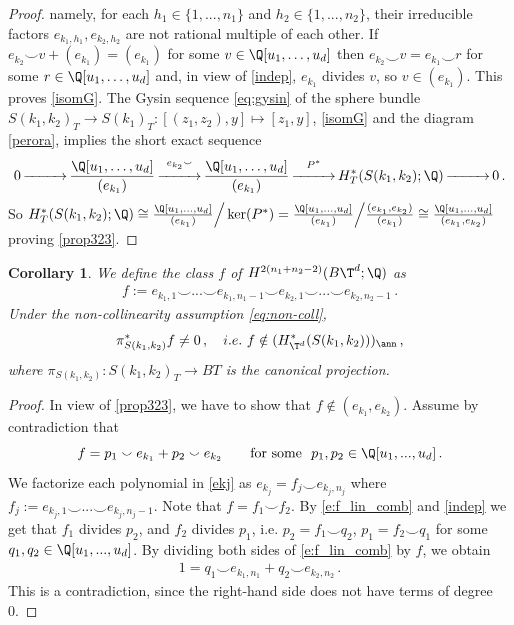 \documentclass[11pt,a4paper,reqno]{article}
\DeclareMathOperator*{\tttoup}{\xrightarrow{\hspace*{25pt}}}
\numberwithin{equation}{section}
\newtheorem{corollary}[theorem]{Corollary}
\theoremstyle{definition}
\begin{document}
\begin{proof}
namely, for each $h_1\in\{1,...,n_1\}$ and $h_2\in\{1,...,n_2\}$, their irreducible factors $e_{k_1,h_1},e_{k_2,h_2}$ are not 
rational multiple of each other.
If $ e_{k_2} \smallsmile v+ (e_{k_1})= (e_{k_1})$
for some $ v \in 
\Q[u_1,\dots, u_d] $ then 
$ e_{k_2} \smallsmile v 
= e_{k_1} \smallsmile r $
for some $ r \in 
\Q[u_1,\dots, u_d] $
and, in view of \eqref{indep},
$ e_{k_1} $ divides $ v $,
so $ v \in (e_{k_1})$.
This proves  \eqref{isomG}. 
The Gysin sequence 
\eqref{eq:gysin} of the sphere bundle $S(k_1,k_2)_T \to S(k_1)_T: [(z_1,z_2),y]\mapsto [z_1,y]$, \eqref{isomG}
and  the diagram \eqref{perora}, 
implies the short exact sequence
\begin{align*}
    0\tttoup \frac{\Q[u_1,\dots, u_d]}{(e_{k_1})} \tttoup^{e_{k_2}\smallsmile} \frac{\Q[u_1,\dots, u_d]}{(e_{k_1})} \tttoup^{P^*} H^*_T(S(k_1,k_2);\Q) \tttoup 0 \, . 
\end{align*}
So $ H^*_T(S(k_1,k_2);\Q)\cong \frac{\Q[u_1,\dots, u_d]}{(e_{k_1})}\Big/\ker(P^*)=\frac{\Q[u_1,\dots, u_d]}{(e_{k_1})}\Big/\frac{(e_{k_1},e_{k_2})}{(e_{k_1})}\cong \frac{\Q[u_1,\dots, u_d]}{(e_{k_1},e_{k_2})}$ proving \eqref{prop323}.
\end{proof}


\begin{corollary}\label{cor:nonzero cohomology class}
We define the class $ f $ of $H^{2(n_1+n_2-2)}(B\T^d;\Q) $ as 
\begin{align}\label{eq:f cup product ei}
 f
 :=
 e_{k_1,1}\smallsmile...\smallsmile e_{k_1,n_1-1} \smallsmile
 e_{k_2,1}\smallsmile...\smallsmile e_{k_2,n_2-1}  \, .
\end{align}
Under the non-collinearity assumption \eqref{eq:non-coll},
\[
\pi_{S(k_1,k_2)}^*f\neq0 \, , 
\quad  i.e. \ f \notin (H^*_{\T^d}(S(k_1,k_2)))_\ann  \, , 
\]
where  
$\pi_{S(k_1,k_2)}:S(k_1,k_2)_T\to BT$ is the canonical projection.
\end{corollary}

\begin{proof}
In view of \eqref{prop323}, 
we have to show that $f\not\in(e_{k_1},e_{k_2})$.
Assume by contradiction  that
\begin{equation}
\label{e:f_lin_comb}
f=p_1\smallsmile e_{k_1}+p_2\smallsmile e_{k_2} 
\qquad \text{for some} \ \   p_1,p_2\in\Q[u_1,...,u_d] \, .
\end{equation}
We factorize each polynomial 
in \eqref{ekj}
as 
$e_{k_j}=f_j\smallsmile e_{k_j,n_j}$
where 
$ f_j:=e_{k_j,1}\smallsmile...\smallsmile e_{k_j,n_j-1} $.  
Note that  $f=f_1\smallsmile f_2$.  
By \eqref{e:f_lin_comb} 
and \eqref{indep} we get that $f_1$ divides $p_2$, and $f_2$ divides $p_1$, i.e.
$ p_2=f_1\smallsmile q_2$, $ 
p_1=f_2\smallsmile q_1 $ 
for some $q_1,q_2\in\Q[u_1,...,u_d]$. By dividing both sides of \eqref{e:f_lin_comb} by $f$, we obtain
\begin{align*}
1= q_1\smallsmile e_{k_{1},n_1}+q_2\smallsmile e_{k_{2},n_2} \, . 
\end{align*}
This is a contradiction, since the right-hand side does not have terms of degree 0.
\end{proof}
\end{document}
